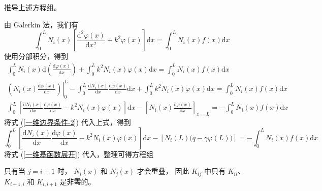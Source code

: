 \begin{exercise}
    推导上述方程组。
\end{exercise}

\begin{solution}
    由 Galerkin 法，我们有
    \begin{equation*}
        \int_{0}^{L}N_i(x)\left[
            \frac{\text{d}^2\varphi(x)}{\text{d}x^2}+k^2\varphi(x)
        \right]\text{d}x = 
        \int_{0}^{L}N_i(x)f(x)\text{d}x
    \end{equation*}
    使用分部积分，得到
    \begin{gather*}
        \int_{0}^{L}N_i(x)
        \text{d}\left(\frac{\text{d}\varphi(x)}{\text{d}x}\right) 
        +\int_{0}^{L}
            k^2N_i(x)\varphi(x)
        \text{d}x = 
        \int_{0}^{L}N_i(x)f(x)\text{d}x\\
        \left.\left(
            N_i(x)\frac{\text{d}\varphi(x)}{\text{d}x}
        \right)\right|_0^L
        -\int_{0}^{L}
        \frac{\text{d}N_i(x)}{\text{d}x}
        \frac{\text{d}\varphi(x)}{\text{d}x}
        \text{d}x
        +\int_{0}^{L}
            k^2N_i(x)\varphi(x)
        \text{d}x = 
        \int_{0}^{L}N_i(x)f(x)\text{d}x\\
        \int_{0}^{L}\left[
            \frac{\text{d}N_i(x)}{\text{d}x}\frac{\text{d}\varphi(x)}{\text{d}x}
            - k^2N_i(x)\varphi(x)
        \right]\text{d}x
        -\left[N_i(x)\frac{\text{d}\varphi(x)}{\text{d}x}\right]_{x=L} = 
        -\int_{0}^{L}N_i(x)f(x)\text{d}x
    \end{gather*}
    将式 (\ref{一维边界条件-2}) 代入上式，得到
    \begin{equation*}
        \int_{0}^{L}\left[
            \frac{\text{d}N_i(x)}{\text{d}x}\frac{\text{d}\varphi(x)}{\text{d}x}
            - k^2N_i(x)\varphi(x)
        \right]\text{d}x
        -\left[N_i(L)\Big(q-\gamma\varphi(L)\Big)\right]= 
        -\int_{0}^{L}N_i(x)f(x)\text{d}x
    \end{equation*}
    将式 (\ref{一维基函数展开}) 代入，整理可得方程组
\end{solution}

\begin{note}
    只有当 $j=i\pm1$ 时，
    $N_i(x)$ 和 $N_j(x)$ 才会重叠，
    因此 $K_{ij}$ 中只有 $K_{ii}$、$K_{i+1,i}$ 
    和 $K_{i,i+1}$ 是非零的。
\end{note}

